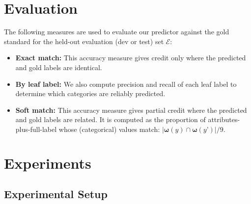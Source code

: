 \documentclass[11pt,letterpaper]{article}
\newcommand{\ensuretext}[1]{#1}
\newcommand{\cjdmarker}{\ensuretext{\textcolor{green}{\ensuremath{^{\textsc{CJ}}_{\textsc{D}}}}}}
\newcommand{\nssmarker}{\ensuretext{\textcolor{magenta}{\ensuremath{^{\textsc{NS}}_{\textsc{S}}}}}}
\newcommand{\arkcomment}[3]{\ensuretext{\textcolor{#3}{[#1 #2]}}}
\newcommand{\cjd}[1]{\arkcomment{\cjdmarker}{#1}{green}}
\newcommand{\nss}[1]{\arkcomment{\nssmarker}{#1}{magenta}}
\newcommand{\finalversion}[1]{}
\newcommand{\costversion}[1]{}
\begin{document}
\section{Evaluation}\label{sec:eval}

The following measures are used to evaluate our predictor against the gold standard 
for the held-out evaluation (dev or test) set $\mathcal{E}$:
\begin{itemize}
  \item \textbf{Exact match:} This accuracy measure gives credit only where the predicted and gold labels 
  are identical.\costversion{\nss{} When the model is allowed to predict internal labels, we will report 
  overall precision and recall of leaf labels. Otherwise, we report accuracy.}
  \item \textbf{By leaf label:} We also compute precision and recall of each leaf label 
  to determine which categories are reliably predicted.
  \item \textbf{Soft match:} This accuracy measure gives partial credit where the predicted and gold labels 
  are related. It is computed as the proportion of attributes-plus-full-label whose (categorical) values match: 
  \mbox{$|\boldsymbol{\omega}(y) \cap \boldsymbol{\omega}(y’)|/9$}.\finalversion{\cjd{Should these be differentially weighted based on their height in the hierarchy?}}
\end{itemize}

\section{Experiments}\label{sec:exp}

\subsection{Experimental Setup}\label{sec:exptsetup}
\end{document}
